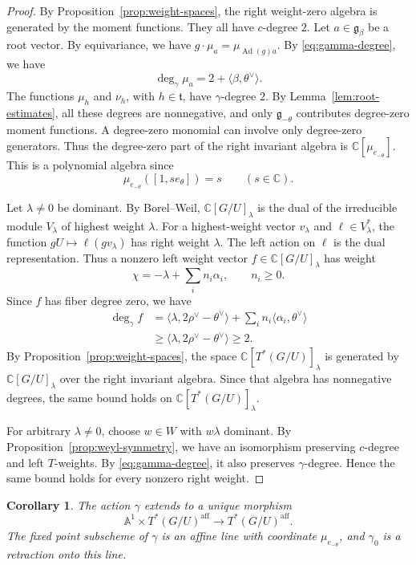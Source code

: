 \documentclass[12pt]{article}
\theoremstyle{paperplain}
\newtheorem{corollary}[theorem]{Corollary}
\theoremstyle{paperdefinition}
\DeclareMathOperator{\Ad}{Ad}
\newcommand{\C}{\mathbb C}
\newcommand{\g}{\mathfrak g}
\newcommand{\tfrak}{\mathfrak t}
\begin{document}
\begin{proof}
    By Proposition~\ref{prop:weight-spaces}, the right weight-zero algebra is generated by the moment functions. They all have $c$-degree $2$. Let $a\in\g_\beta$ be a root vector. By equivariance, we have $g\cdot\mu_a=\mu_{\Ad(g)a}$. By \eqref{eq:gamma-degree}, we have
    $$
        \deg_\gamma\mu_a=2+\langle\beta,\theta^\vee\rangle.
    $$
    The functions $\mu_h$ and $\nu_h$, with $h\in\tfrak$, have $\gamma$-degree $2$. By Lemma~\ref{lem:root-estimates}, all these degrees are nonnegative, and only $\g_{-\theta}$ contributes degree-zero moment functions. A degree-zero monomial can involve only degree-zero generators. Thus the degree-zero part of the right invariant algebra is $\C[\mu_{e_{-\theta}}]$. This is a polynomial algebra since
    $$
        \mu_{e_{-\theta}}([1,se_\theta])=s\qquad(s\in\C).
    $$

    Let $\lambda\ne0$ be dominant. By Borel--Weil, $\C[G/U]_\lambda$ is the dual of the irreducible module $V_\lambda$ of highest weight $\lambda$. For a highest-weight vector $v_\lambda$ and $\ell\in V_\lambda^*$, the function $gU\mapsto\ell(gv_\lambda)$ has right weight $\lambda$. The left action on $\ell$ is the dual representation. Thus a nonzero left weight vector $f\in\C[G/U]_\lambda$ has weight
    $$
        \chi=-\lambda+\sum_i n_i\alpha_i,\qquad n_i\ge0.
    $$
    Since $f$ has fiber degree zero, we have
    \begin{align*}
        \deg_\gamma f
        &=\langle\lambda,2\rho^\vee-\theta^\vee\rangle
          +\sum_i n_i\langle\alpha_i,\theta^\vee\rangle\\
        &\ge\langle\lambda,2\rho^\vee-\theta^\vee\rangle\ge2.
    \end{align*}
    By Proposition~\ref{prop:weight-spaces}, the space $\C[T^*(G/U)]_\lambda$ is generated by $\C[G/U]_\lambda$ over the right invariant algebra. Since that algebra has nonnegative degrees, the same bound holds on $\C[T^*(G/U)]_\lambda$.

    For arbitrary $\lambda\ne0$, choose $w\in W$ with $w\lambda$ dominant. By Proposition~\ref{prop:weyl-symmetry}, we have an isomorphism preserving $c$-degree and left $T$-weights. By \eqref{eq:gamma-degree}, it also preserves $\gamma$-degree. Hence the same bound holds for every nonzero right weight.
\end{proof}

\begin{corollary}\label{cor:contraction}
    The action $\gamma$ extends to a unique morphism
    $$
        \mathbb A^1\times T^*(G/U)^{\mathrm{aff}}
        \longrightarrow T^*(G/U)^{\mathrm{aff}}.
    $$
    The fixed point subscheme of $\gamma$ is an affine line with coordinate $\mu_{e_{-\theta}}$, and $\gamma_0$ is a retraction onto this line.
\end{corollary}
\end{document}
